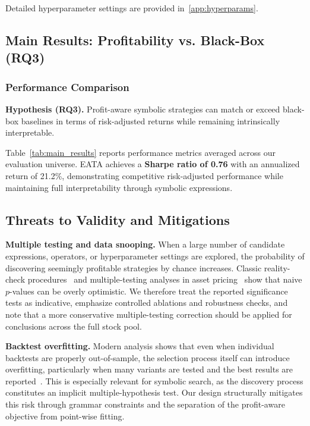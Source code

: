Detailed hyperparameter settings are provided in~\ref{app:hyperparams}.

\subsection{Main Results: Profitability vs. Black-Box (RQ3)}

\subsubsection{Performance Comparison}
\textbf{Hypothesis (RQ3).} Profit-aware symbolic strategies can match or exceed black-box baselines in terms of risk-adjusted returns while remaining intrinsically interpretable.

Table~\ref{tab:main_results} reports performance metrics averaged across our evaluation universe. EATA achieves a \textbf{Sharpe ratio of 0.76} with an annualized return of 21.2\%, demonstrating competitive risk-adjusted performance while maintaining full interpretability through symbolic expressions.

\begin{table}[htbp]
\centering
\caption{Main Performance Comparison. EATA achieves competitive Sharpe Ratio while maintaining interpretability.}
\label{tab:main_results}

\end{table}

\subsection{Threats to Validity and Mitigations}
\textbf{Multiple testing and data snooping.} When a large number of candidate expressions, operators, or hyperparameter settings are explored, the probability of discovering seemingly profitable strategies by chance increases. Classic reality-check procedures~\cite{white2000reality_check,hansen2005spa} and multiple-testing analyses in asset pricing~\cite{harvey2016multiple_testing} show that naive $p$-values can be overly optimistic. We therefore treat the reported significance tests as indicative, emphasize controlled ablations and robustness checks, and note that a more conservative multiple-testing correction should be applied for conclusions across the full stock pool.

\textbf{Backtest overfitting.} Modern analysis shows that even when individual backtests are properly out-of-sample, the selection process itself can introduce overfitting, particularly when many variants are tested and the best results are reported~\cite{bailey2014deflated_sharpe,bailey2017pbo}. This is especially relevant for symbolic search, as the discovery process constitutes an implicit multiple-hypothesis test. Our design structurally mitigates this risk through grammar constraints and the separation of the profit-aware objective from point-wise fitting.

